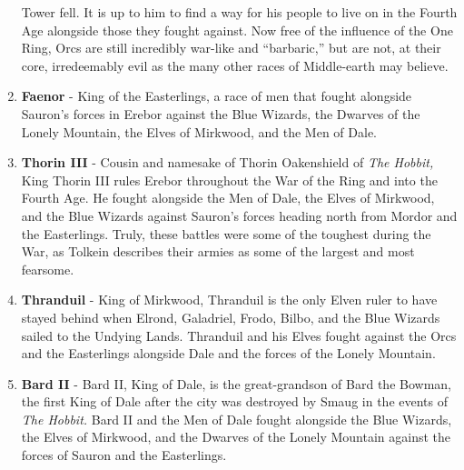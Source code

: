 \documentclass[10pt, letterpaper]{article}
\begin{document}
\begin{enumerate}
  Tower fell. It is up to him to find a way for his people to live on in
  the Fourth Age alongside those they fought against. Now free of the
  influence of the One Ring, Orcs are still incredibly war-like and
  ``barbaric,'' but are not, at their core, irredeemably evil as the
  many other races of Middle-earth may believe.
\item
  \textbf{Faenor} - King of the Easterlings, a race of men that fought
  alongside Sauron's forces in Erebor against the Blue Wizards, the
  Dwarves of the Lonely Mountain, the Elves of Mirkwood, and the Men of
  Dale.
\item
  \textbf{Thorin III} - Cousin and namesake of Thorin Oakenshield of
  \emph{The Hobbit,} King Thorin III rules Erebor throughout the War of
  the Ring and into the Fourth Age. He fought alongside the Men of Dale,
  the Elves of Mirkwood, and the Blue Wizards against Sauron's forces
  heading north from Mordor and the Easterlings. Truly, these battles
  were some of the toughest during the War, as Tolkein describes their
  armies as some of the largest and most fearsome.
\item
  \textbf{Thranduil} - King of Mirkwood, Thranduil is the only Elven
  ruler to have stayed behind when Elrond, Galadriel, Frodo, Bilbo, and
  the Blue Wizards sailed to the Undying Lands. Thranduil and his Elves
  fought against the Orcs and the Easterlings alongside Dale and the
  forces of the Lonely Mountain.
\item
  \textbf{Bard II} - Bard II, King of Dale, is the great-grandson of
  Bard the Bowman, the first King of Dale after the city was destroyed
  by Smaug in the events of \emph{The Hobbit.} Bard II and the Men of
  Dale fought alongside the Blue Wizards, the Elves of Mirkwood, and the
  Dwarves of the Lonely Mountain against the forces of Sauron and the
  Easterlings.
\end{enumerate}
\end{document}
